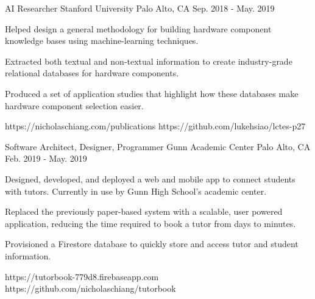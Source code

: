 

\begin{cventries}

  \cvartifact
    {AI Researcher} %
    {Stanford University} %
    {Palo Alto, CA} %
    {Sep. 2018 - May. 2019} %
    {
      \begin{cvitems} %
        \item {Helped design a general methodology for building hardware
		component knowledge bases using machine-learning techniques.}
	\item {Extracted both textual and non-textual information to create
		industry-grade relational databases for hardware components.}
	\item {Produced a set of application studies that highlight how
		these databases make hardware component selection easier.}
      \end{cvitems}
    }
    {https://nicholaschiang.com/publications} %
    {https://github.com/lukehsiao/lctes-p27} %

  \cvartifact
    {Software Architect, Designer, Programmer} %
    {Gunn Academic Center} %
    {Palo Alto, CA} %
    {Feb. 2019 - May. 2019} %
    {
      \begin{cvitems} %
        \item {Designed, developed, and deployed a web and mobile app to connect
		students with tutors. Currently in use by Gunn High School's
		academic center.}
        \item {Replaced the previously paper-based system with a scalable,
		user powered application, reducing the time required to book a
		tutor from days to minutes.}
        \item {Provisioned a Firestore database to quickly store and access
		tutor and student information.}
      \end{cvitems}
    }
    {https://tutorbook-779d8.firebaseapp.com} %
    {https://github.com/nicholaschiang/tutorbook} %

\end{cventries}
